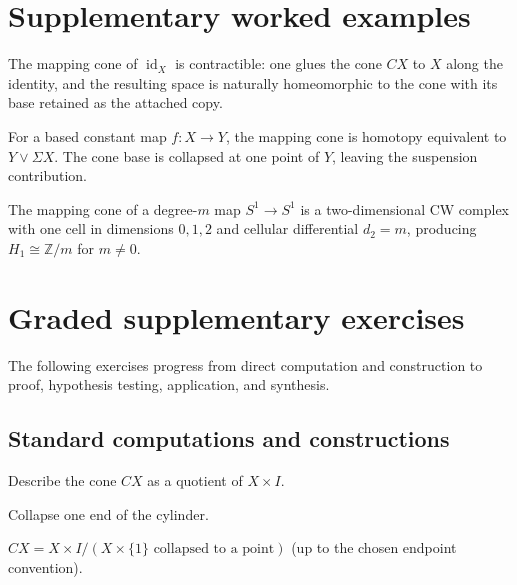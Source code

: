 \section{Supplementary worked examples}
\label{sec:viii07-pedagogy}

\begin{example}\label{ex:viii07-ped-01}
The mapping cone of $\operatorname{id}_X$ is contractible: one glues the cone $CX$ to $X$ along the identity, and the resulting space is naturally homeomorphic to the cone with its base retained as the attached copy.
\end{example}

\begin{example}\label{ex:viii07-ped-02}
For a based constant map $f:X\to Y$, the mapping cone is homotopy equivalent to $Y\vee\Sigma X$.  The cone base is collapsed at one point of $Y$, leaving the suspension contribution.
\end{example}

\begin{example}\label{ex:viii07-ped-03}
The mapping cone of a degree-$m$ map $S^1\to S^1$ is a two-dimensional CW complex with one cell in dimensions $0,1,2$ and cellular differential $d_2=m$, producing $H_1\cong\mathbb Z/m$ for $m\ne0$.
\end{example}

\section{Graded supplementary exercises}
The following exercises progress from direct computation and construction to proof, hypothesis testing, application, and synthesis.

\subsection*{Standard computations and constructions}

\begin{exercise}\label{exr:viii07-ped-01}
Describe the cone $CX$ as a quotient of $X\times I$.
\end{exercise}
\begin{hint}
Collapse one end of the cylinder.
\end{hint}
\begin{solution}
$CX=X\times I/(X\times\{1\}\text{ collapsed to a point})$ (up to the chosen endpoint convention).
\end{solution}

